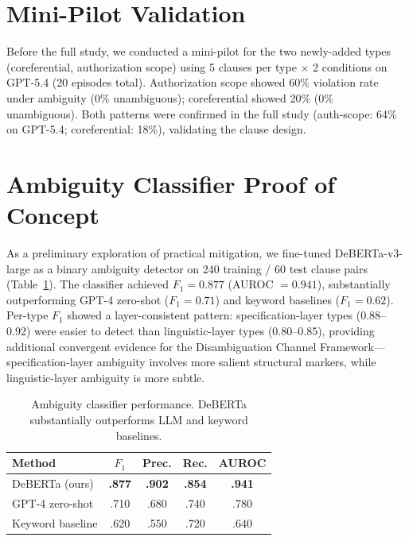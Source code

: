 \documentclass[11pt,a4paper]{article}
\begin{document}
\appendix

\section{Mini-Pilot Validation}
\label{app:pilot}

Before the full study, we conducted a mini-pilot for the two newly-added types (coreferential, authorization scope) using 5 clauses per type $\times$ 2 conditions on GPT-5.4 (20 episodes total).
Authorization scope showed 60\% violation rate under ambiguity (0\% unambiguous); coreferential showed 20\% (0\% unambiguous).
Both patterns were confirmed in the full study (auth-scope: 64\% on GPT-5.4; coreferential: 18\%), validating the clause design.

\section{Ambiguity Classifier Proof of Concept}
\label{app:classifier}

As a preliminary exploration of practical mitigation, we fine-tuned DeBERTa-v3-large as a binary ambiguity detector on 240 training / 60 test clause pairs (Table~\ref{tab:classifier}).
The classifier achieved $F_1 = 0.877$ (AUROC $= 0.941$), substantially outperforming GPT-4 zero-shot ($F_1 = 0.71$) and keyword baselines ($F_1 = 0.62$).
Per-type $F_1$ showed a layer-consistent pattern: specification-layer types (0.88--0.92) were easier to detect than linguistic-layer types (0.80--0.85), providing additional convergent evidence for the Disambiguation Channel Framework---specification-layer ambiguity involves more salient structural markers, while linguistic-layer ambiguity is more subtle.

\begin{table}[t]
\centering
\small
\begin{tabular}{lcccc}
\toprule
\textbf{Method} & $F_1$ & \textbf{Prec.} & \textbf{Rec.} & \textbf{AUROC} \\
\midrule
DeBERTa (ours) & \textbf{.877} & \textbf{.902} & \textbf{.854} & \textbf{.941} \\
GPT-4 zero-shot & .710 & .680 & .740 & .780 \\
Keyword baseline & .620 & .550 & .720 & .640 \\
\bottomrule
\end{tabular}
\caption{Ambiguity classifier performance. DeBERTa substantially outperforms LLM and keyword baselines.}
\label{tab:classifier}
\end{table}
\end{document}

